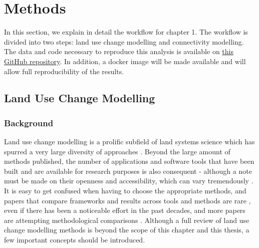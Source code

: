 \section{Methods}
In this section, we explain in detail the workflow for chapter 1. The workflow is divided into two steps: land use change modelling and connectivity modelling. The data and code necessary to reproduce this analysis is available on \href{https://github.com/VLucet/landchange-connectivity-Montérégie}{this GitHub repository}. In addition, a docker image will be made available and will allow full reproducibility of the results.\\

\subsection{Land Use Change Modelling}

\subsubsection{Background}
Land use change modelling is a prolific subfield of land systems science which has spurred a very large diversity of approaches \citep{dang_review_2016, noszczyk_review_2018}. Beyond the large amount of methods published, the number of applications and software tools that have been built and are available for research purposes is also consequent - although a note must be made on their openness and accessibility, which can vary tremendously \citep{moulds_open_2015}. It is easy to get confused when having to choose the appropriate methods, and papers that compare frameworks and results across tools and methods are rare \citep{pontius_comparing_2008, pontius_comparison_2005}, even if there has been a noticeable effort in the past decades, and  more papers are attempting methodological comparisons \citep{sun_comparison_2018}. Although a full review of land use change modelling methods is beyond the scope of this chapter and this thesis, a few important concepts should be introduced.

